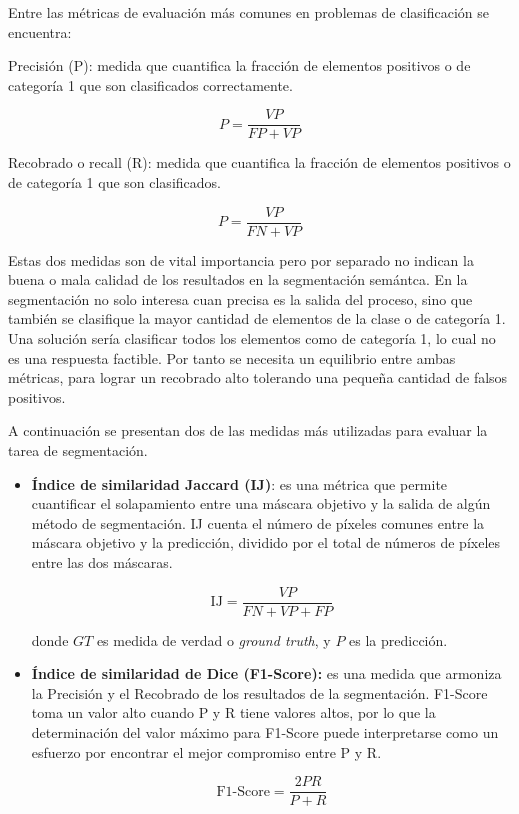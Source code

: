 Entre las métricas de evaluación más comunes en problemas de clasificación se encuentra:

\begin{definition}
	Precisión (P): medida que cuantifica la fracción de elementos positivos o de categoría 1 que son clasificados correctamente. 
	
	$$ P = \frac{VP}{FP + VP}$$	
\end{definition}

\begin{definition}
	Recobrado o recall (R): medida que cuantifica la fracción de elementos positivos o de categoría 1 que son clasificados.
	
	$$ P = \frac{VP}{FN + VP}$$	
\end{definition}

Estas dos medidas son de vital importancia pero por separado no indican la buena o mala calidad de los resultados en la segmentación semántca. En la segmentación no solo interesa cuan precisa es la salida del proceso, sino que también se clasifique la mayor cantidad de elementos de la clase o de categoría 1. Una solución sería clasificar todos los elementos como de categoría 1, lo cual no es una respuesta factible. Por tanto se necesita un equilibrio entre ambas métricas, para lograr un recobrado alto tolerando una pequeña cantidad de falsos positivos.

A continuación se presentan dos de las medidas más utilizadas para evaluar la tarea de segmentación.

\begin{itemize}
	\item \textbf{Índice de similaridad Jaccard (IJ)}: es una métrica que permite cuantificar el solapamiento entre una máscara objetivo y la salida de algún método de segmentación. IJ cuenta el número de píxeles comunes entre la máscara objetivo y la predicción, dividido por el total de números de píxeles entre las dos máscaras.
	
	\begin{equation}
		\text{IJ} = \frac{VP}{FN + VP + FP}
	\end{equation}

	donde $GT$ es medida de verdad o \textit{ground truth}, y $P$ es la predicción.
	
	\item \textbf{Índice de similaridad de Dice (F1-Score):} es una medida que armoniza la Precisión y el Recobrado de los resultados de la segmentación. F1-Score toma un valor alto cuando P y R tiene valores altos, por lo que la determinación del valor máximo para F1-Score puede interpretarse como un esfuerzo por encontrar el mejor compromiso entre P y R.
	
		
	\begin{equation}
		\text{F1-Score} = \frac{2PR}{P + R}
	\end{equation}
\end{itemize}



